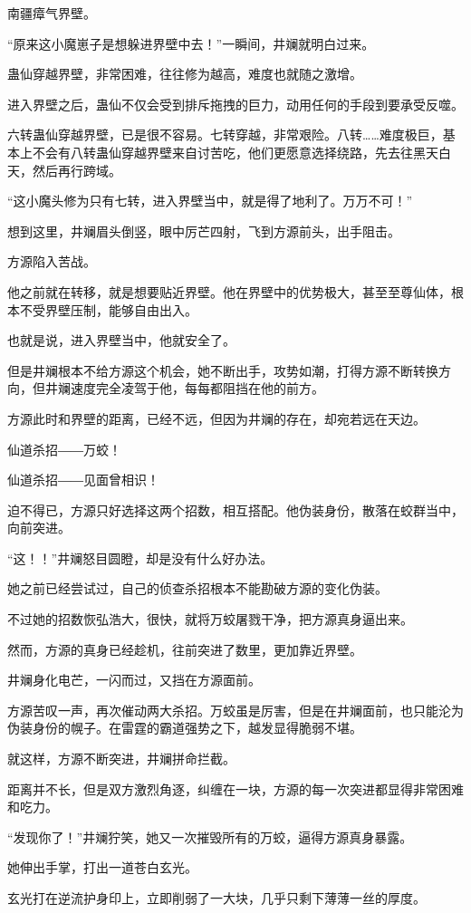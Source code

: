 \begin{this_body}
南疆瘴气界壁。

“原来这小魔崽子是想躲进界壁中去！”一瞬间，井斓就明白过来。

蛊仙穿越界壁，非常困难，往往修为越高，难度也就随之激增。

进入界壁之后，蛊仙不仅会受到排斥拖拽的巨力，动用任何的手段到要承受反噬。

六转蛊仙穿越界壁，已是很不容易。七转穿越，非常艰险。八转……难度极巨，基本上不会有八转蛊仙穿越界壁来自讨苦吃，他们更愿意选择绕路，先去往黑天白天，然后再行跨域。

“这小魔头修为只有七转，进入界壁当中，就是得了地利了。万万不可！”

想到这里，井斓眉头倒竖，眼中厉芒四射，飞到方源前头，出手阻击。

方源陷入苦战。

他之前就在转移，就是想要贴近界壁。他在界壁中的优势极大，甚至至尊仙体，根本不受界壁压制，能够自由出入。

也就是说，进入界壁当中，他就安全了。

但是井斓根本不给方源这个机会，她不断出手，攻势如潮，打得方源不断转换方向，但井斓速度完全凌驾于他，每每都阻挡在他的前方。

方源此时和界壁的距离，已经不远，但因为井斓的存在，却宛若远在天边。

仙道杀招――万蛟！

仙道杀招――见面曾相识！

迫不得已，方源只好选择这两个招数，相互搭配。他伪装身份，散落在蛟群当中，向前突进。

“这！！”井斓怒目圆瞪，却是没有什么好办法。

她之前已经尝试过，自己的侦查杀招根本不能勘破方源的变化伪装。

不过她的招数恢弘浩大，很快，就将万蛟屠戮干净，把方源真身逼出来。

然而，方源的真身已经趁机，往前突进了数里，更加靠近界壁。

井斓身化电芒，一闪而过，又挡在方源面前。

方源苦叹一声，再次催动两大杀招。万蛟虽是厉害，但是在井斓面前，也只能沦为伪装身份的幌子。在雷霆的霸道强势之下，越发显得脆弱不堪。

就这样，方源不断突进，井斓拼命拦截。

距离并不长，但是双方激烈角逐，纠缠在一块，方源的每一次突进都显得非常困难和吃力。

“发现你了！”井斓狞笑，她又一次摧毁所有的万蛟，逼得方源真身暴露。

她伸出手掌，打出一道苍白玄光。

玄光打在逆流护身印上，立即削弱了一大块，几乎只剩下薄薄一丝的厚度。


\end{this_body}

